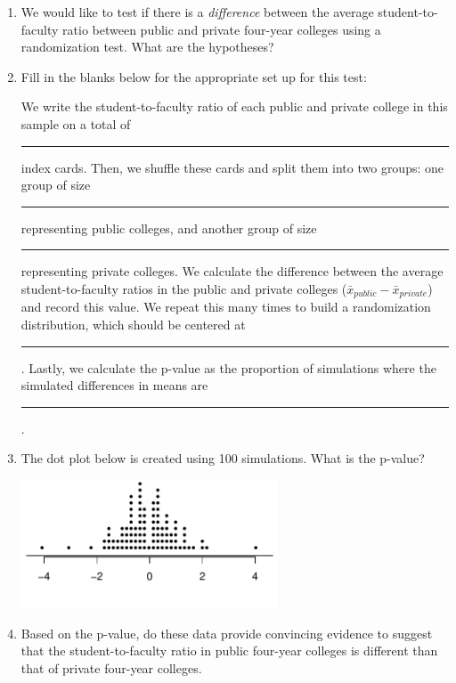 \documentclass[11pt]{article}
\begin{document}
\begin{enumerate}

\item We would like to test if there is a \emph{difference} between the average student-to-faculty ratio between public and private four-year colleges using a randomization test. What are the hypotheses?

\item Fill in the blanks below for the appropriate set up for this test:

\begin{doublespace}
We write the student-to-faculty ratio of each public and private college in this sample on a total of \rule{2cm}{0.5pt} index cards. Then, we shuffle these cards and split them into two groups: one group of size \rule{2cm}{0.5pt} representing public colleges, and another group of size \rule{2cm}{0.5pt} representing private colleges. We calculate the difference between the average student-to-faculty ratios in the public and private colleges ($\bar{x}_{public} - \bar{x}_{private}$) and record this value. We repeat this many times to build a randomization distribution, which should be centered at \rule{2cm}{0.5pt} . Lastly, we calculate the p-value as the proportion of simulations where the simulated differences in means are \rule{2cm}{0.5pt}.
\end{doublespace}

\item The dot plot below is created using 100 simulations. What is the p-value?

\begin{center}
\includegraphics[width=0.6\textwidth]{ratio/rand_dist}
\end{center}

\item Based on the p-value, do these data provide convincing evidence to suggest that the student-to-faculty ratio in public four-year colleges is different than that of private four-year  colleges.

\end{enumerate}
\end{document}
